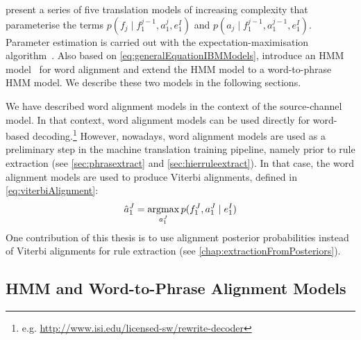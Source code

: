 %
\citet{brown-dellapietra-dellapietra-mercer-1993} present a series
of five translation models of increasing complexity that parameterise the terms
$p(f_j \mid f_1^{j - 1}, a_1^j, e_1^I)$ and
$p(a_j \mid f_1^{j-1}, a_1^{j-1}, e_1^I)$.
Parameter estimation is carried out with the
expectation-maximisation algorithm~\citep{dempster-laird-rubin:1977:JRSS}.
Also based on \autoref{eq:generalEquationIBMModels}, \citet{vogel-ney-tillmann}
introduce an HMM model~\citep{rabiner:1989:IEEE} for
word alignment and \citet{deng-and-byrne:2008:ASLP}
extend the HMM model to a word-to-phrase HMM model. We describe these two models in the following
sections.

We have described word alignment models in the context of the source-channel
model. In that context, word alignment models can be used directly for word-based
decoding.\footnote{e.g. \url{http://www.isi.edu/licensed-sw/rewrite-decoder}} %
However, nowadays, word alignment models are used as a preliminary
step in the machine translation training pipeline, namely
prior to rule extraction (see \autoref{sec:phrasextract} and
\autoref{sec:hierruleextract}). In that case,
the word alignment models are used to produce Viterbi alignments, defined
in \autoref{eq:viterbiAlignment}:
%
\begin{equation}
    \hat{a}_1^J = \operatorname*{argmax}_{a_1^J} p(f_1^J, a_1^J \mid e_1^I)
  \label{eq:viterbiAlignment}
\end{equation}
%
One contribution of this
thesis is to use alignment posterior probabilities instead of
Viterbi alignments for rule
extraction (see \autoref{chap:extractionFromPosteriors}).

\subsection{HMM and Word-to-Phrase Alignment Models}
\label{sec:statisticalMachineTranslationHmmAlignmentModel}



